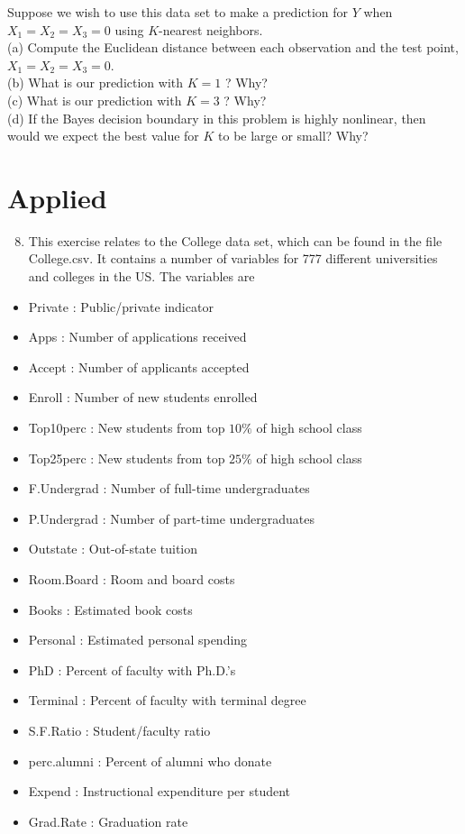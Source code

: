 \documentclass[10pt]{article}
\begin{document}
Suppose we wish to use this data set to make a prediction for $Y$ when $X_{1}=X_{2}=X_{3}=0$ using $K$-nearest neighbors.\\
(a) Compute the Euclidean distance between each observation and the test point, $X_{1}=X_{2}=X_{3}=0$.\\
(b) What is our prediction with $K=1$ ? Why?\\
(c) What is our prediction with $K=3$ ? Why?\\
(d) If the Bayes decision boundary in this problem is highly nonlinear, then would we expect the best value for $K$ to be large or small? Why?

\section*{Applied}
\begin{enumerate}
  \setcounter{enumi}{7}
  \item This exercise relates to the College data set, which can be found in the file College.csv. It contains a number of variables for 777 different universities and colleges in the US. The variables are
\end{enumerate}

\begin{itemize}
  \item Private : Public/private indicator
  \item Apps : Number of applications received
  \item Accept : Number of applicants accepted
  \item Enroll : Number of new students enrolled
  \item Top10perc : New students from top $10 \%$ of high school class
  \item Top25perc : New students from top $25 \%$ of high school class
  \item F.Undergrad : Number of full-time undergraduates
  \item P.Undergrad : Number of part-time undergraduates
  \item Outstate : Out-of-state tuition
  \item Room.Board : Room and board costs
  \item Books : Estimated book costs
  \item Personal : Estimated personal spending
  \item PhD : Percent of faculty with Ph.D.'s
  \item Terminal : Percent of faculty with terminal degree
  \item S.F.Ratio : Student/faculty ratio
  \item perc.alumni : Percent of alumni who donate
  \item Expend : Instructional expenditure per student
  \item Grad.Rate : Graduation rate
\end{itemize}
\end{document}
